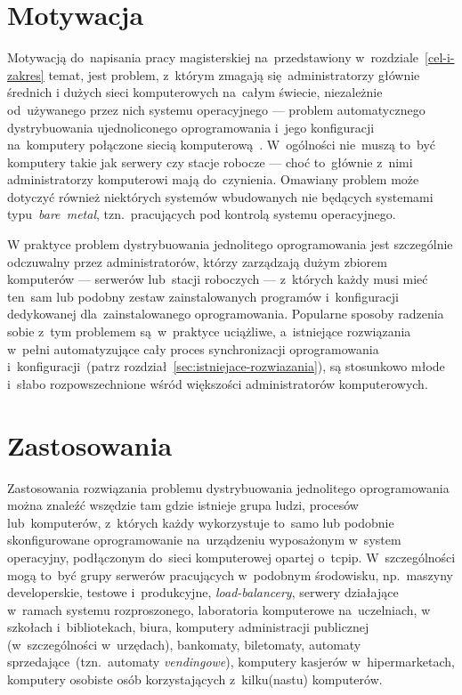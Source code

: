 \documentclass[thesis]{subfiles}
\begin{document}
\section{Motywacja}

Motywacją do~napisania pracy magisterskiej na~przedstawiony w~rozdziale~\ref{cel-i-zakres} temat, jest problem, z~którym zmagają się~administratorzy głównie średnich i dużych sieci komputerowych na~całym świecie, niezależnie od~używanego przez nich systemu operacyjnego --- problem automatycznego dystrybuowania ujednoliconego oprogramowania i~jego konfiguracji na~komputery połączone siecią komputerową~\cite{so-problem-intro}. W~ogólności nie~muszą to~być komputery takie jak serwery czy stacje robocze --- choć to~głównie z~nimi administratorzy komputerowi mają do~czynienia. Omawiany problem może dotyczyć również niektórych systemów wbudowanych nie będących systemami typu~\mbox{\emph{bare~metal}}, tzn.~pracujących pod kontrolą systemu operacyjnego.

W praktyce problem dystrybuowania jednolitego oprogramowania jest szczególnie odczuwalny przez administratorów, którzy zarządzają dużym zbiorem komputerów --- serwerów lub~stacji roboczych --- z~których każdy musi mieć ten~sam lub podobny zestaw zainstalowanych programów i~konfiguracji dedykowanej dla~zainstalowanego oprogramowania. Popularne sposoby radzenia sobie z~tym problemem są~w~praktyce uciążliwe, a~istniejące rozwiązania w~pełni automatyzujące cały proces synchronizacji oprogramowania i~konfiguracji~(patrz rozdział~\ref{sec:istniejace-rozwiazania}), są stosunkowo młode i~słabo rozpowszechnione wśród większości administratorów komputerowych.


\section{Zastosowania}

Zastosowania rozwiązania problemu dystrybuowania jednolitego oprogramowania można znaleźć wszędzie tam gdzie istnieje grupa ludzi, procesów lub~komputerów, z~których każdy wykorzystuje to~samo lub podobnie skonfigurowane oprogramowanie na~urządzeniu wyposażonym w~system operacyjny, podłączonym do~sieci komputerowej opartej o~\gls{tcpip}. W~szczególności mogą to~być grupy serwerów pracujących w~podobnym środowisku, np.~maszyny developerskie, testowe i~produkcyjne, \emph{load-balancery}, serwery działające w~ramach systemu rozproszonego, laboratoria komputerowe na~uczelniach, w szkołach i~bibliotekach, biura, komputery administracji publicznej (w~szczególności w~urzędach), bankomaty, biletomaty, automaty sprzedające~(tzn.~automaty \emph{vendingowe}), komputery kasjerów w~hipermarketach, komputery osobiste osób korzystających z~kilku(nastu) komputerów.
\end{document}
